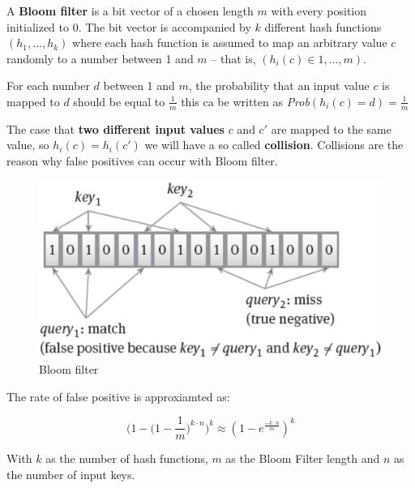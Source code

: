 \begin{tcolorbox}
A \textbf{Bloom filter} is a bit vector of a chosen length \(m\)
with every position initialized to 0. The bit vector is accompanied by
\(k\) different hash functions \((h_1,...,h_k)\) where each hash function is
assumed to map an arbitrary value \(c\) randomly to a number between
1 and \(m\) – that is, \((h_i(c) \in {1,...,m})\).
\end{tcolorbox}

For each number \(d\) between 1 and \(m\), the probability that an input value \(c\) is mapped to \(d\) should be equal to \(\frac{1}{m}\) this ca be written as \textit{Prob}\((h_i(c) = d) = \frac{1}{m}\)

The case that \textbf{two different input values} \(c\) and \(c'\) are mapped to the same value, so \(h_i(c) = h_i(c')\) we will have a so called \textbf{collision}. Collisions are the reason why false positives can occur with Bloom filter.
\newpage
\begin{figure}[!h]
    \centering
    \includegraphics[width=0.50\linewidth]{images/AdvancedDataManagment/extensible_record_store/bloom_filter.jpeg}
    \caption{Bloom filter}
\end{figure}

The rate of false positive is approxiamted as:
\begin{tcolorbox}
\[\biggl(1 - \biggl(1 - \frac{1}{m}\biggl)^{k \cdot n}\biggl)^k \approx (1 - e^{\frac{-k \cdot n}{m}})^k\]
\end{tcolorbox}
With \(k\) as the number of hash functions, \(m\) as the Bloom Filter length and \(n\) as the number of input keys.
